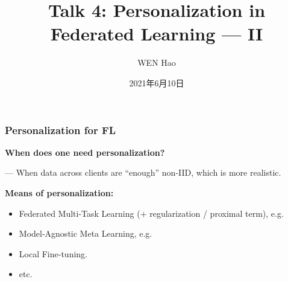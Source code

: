 


\title[Personalization]{Talk 4: Personalization in Federated Learning --- II}
\date{2021年6月10日}
\author[]{WEN Hao}




\setlength{\belowdisplayskip}{5pt} \setlength{\belowdisplayshortskip}{5pt}
\setlength{\abovedisplayskip}{5pt} \setlength{\abovedisplayshortskip}{5pt}


\begin{frame}
\titlepage %
\end{frame}

\begin{frame}
\frametitle{Personalization for FL}

{\bfseries When does one need personalization?}

\vspace{0.2em}
\noindent --- When data across clients are ``enough'' non-IID, which is more realistic.

\pause
\vspace{0.8em}

{\bfseries Means of personalization:}
\begin{itemize}
    \item Federated Multi-Task Learning (+ regularization / proximal term), e.g. \cite{smith2017mocha}
    \item Model-Agnostic Meta Learning, e.g. \cite{finn2017maml}
    \item Local Fine-tuning.
    \item etc.
\end{itemize}

\end{frame}

